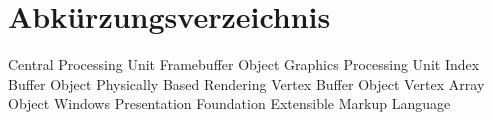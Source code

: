 \section{Abkürzungsverzeichnis}
\begin{acronym}
	 {Central Processing Unit}
	 {Framebuffer Object}
	 {Graphics Processing Unit}
	 {Index Buffer Object}
	 {Physically Based Rendering}
	 {Vertex Buffer Object}
	 {Vertex Array Object}
		{Windows Presentation Foundation}
	 {Extensible Markup Language}
\end{acronym}
